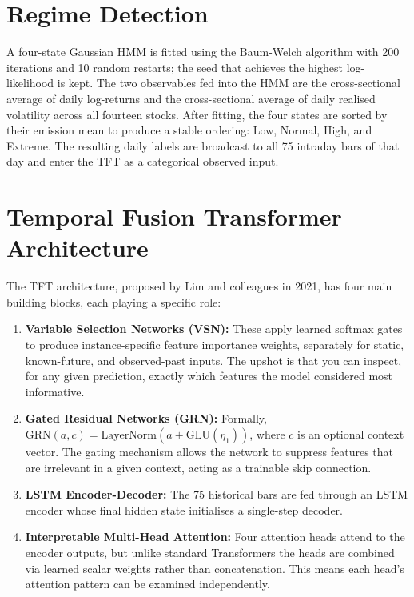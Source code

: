 \section{Regime Detection}

A four-state Gaussian HMM is fitted using the Baum-Welch algorithm with 200 iterations and 10 random restarts; the seed that achieves the highest log-likelihood is kept. The two observables fed into the HMM are the cross-sectional average of daily log-returns and the cross-sectional average of daily realised volatility across all fourteen stocks. After fitting, the four states are sorted by their emission mean to produce a stable ordering: Low, Normal, High, and Extreme. The resulting daily labels are broadcast to all 75 intraday bars of that day and enter the TFT as a categorical observed input.

\section{Temporal Fusion Transformer Architecture}

The TFT architecture, proposed by Lim and colleagues in 2021, has four main building blocks, each playing a specific role:

\begin{enumerate}
\item \textbf{Variable Selection Networks (VSN):} These apply learned softmax gates to produce instance-specific feature importance weights, separately for static, known-future, and observed-past inputs. The upshot is that you can inspect, for any given prediction, exactly which features the model considered most informative.
\item \textbf{Gated Residual Networks (GRN):} Formally, $\text{GRN}(a,c)=\text{LayerNorm}(a+\text{GLU}(\eta_1))$, where $c$ is an optional context vector. The gating mechanism allows the network to suppress features that are irrelevant in a given context, acting as a trainable skip connection.
\item \textbf{LSTM Encoder-Decoder:} The 75 historical bars are fed through an LSTM encoder whose final hidden state initialises a single-step decoder.
\item \textbf{Interpretable Multi-Head Attention:} Four attention heads attend to the encoder outputs, but unlike standard Transformers the heads are combined via learned scalar weights rather than concatenation. This means each head's attention pattern can be examined independently.
\end{enumerate}

